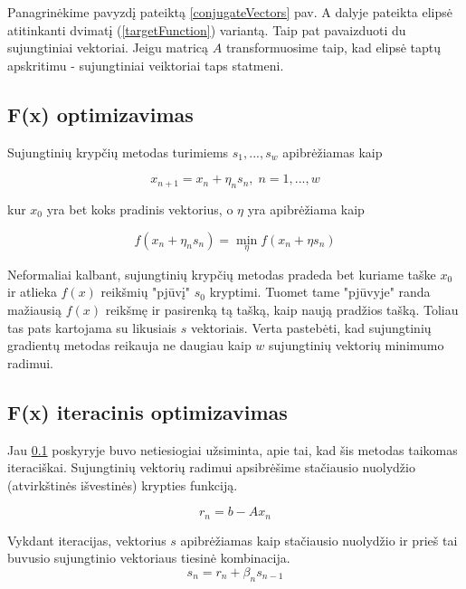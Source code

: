 \documentclass{VUMIFPSmagistrinis}
\begin{document}
Panagrinėkime pavyzdį pateiktą \ref{conjugateVectors} pav.
A dalyje pateikta elipsė atitinkanti dvimatį (\ref{targetFunction}) variantą.
Taip pat pavaizduoti du sujungtiniai vektoriai.
Jeigu matricą $A$ transformuosime taip, kad elipsė taptų apskritimu - sujungtiniai veiktoriai taps statmeni.

\subsection{F(x) optimizavimas}
\label{Foptimizavimas}

Sujungtinių krypčių metodas turimiems $s_{1}, ... , s_{w}$ apibrėžiamas kaip

\begin{equation}
	x_{n + 1} = x_{n} + \eta_{n}s_{n}, \; n = 1, ... , w
\end{equation}

kur $x_{0}$ yra bet koks pradinis vektorius, o $\eta$ yra apibrėžiama kaip

\begin{equation}
	f(x_{n} + \eta_{n} s_{n}) = \min_{\eta} f(x_{n} + \eta s_{n})
\end{equation}

Neformaliai kalbant, sujungtinių krypčių metodas pradeda bet kuriame taške $x_{0}$ ir atlieka $f(x)$ reikšmių "pjūvį" $s_{0}$ kryptimi.
Tuomet tame "pjūvyje" randa mažiausią $f(x)$ reikšmę ir pasirenką tą tašką, kaip naują pradžios tašką.
Toliau tas pats kartojama su likusiais $s$ vektoriais.
Verta pastebėti, kad sujungtinių gradientų metodas reikauja ne daugiau kaip $w$ sujungtinių vektorių minimumo radimui.

\subsection{F(x) iteracinis optimizavimas}
Jau \ref{Foptimizavimas} poskyryje buvo netiesiogiai užsiminta, apie tai, kad šis metodas taikomas iteraciškai.
Sujungtinių vektorių radimui apsibrėšime stačiausio nuolydžio (atvirkštinės išvestinės) krypties funkciją.

\begin{equation}
	r_{n} = b - Ax_{n}
\end{equation}


Vykdant iteracijas, vektorius $s$ apibrėžiamas kaip stačiausio nuolydžio ir prieš tai buvusio sujungtinio vektoriaus tiesinė kombinacija.
\begin{equation}
	s_{n} = r_{n} + \beta_{n} s_{n - 1}
\end{equation}
\end{document}
